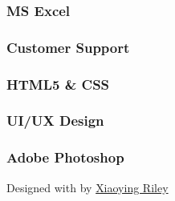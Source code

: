 \documentclass[english,]{article}
\begin{document}
\hypertarget{ms-excel}{%
\subsubsection{MS Excel}\label{ms-excel}}

\hypertarget{customer-support}{%
\subsubsection{Customer Support}\label{customer-support}}

\hypertarget{html5-css}{%
\subsubsection{HTML5 \& CSS}\label{html5-css}}

\hypertarget{uiux-design}{%
\subsubsection{UI/UX Design}\label{uiux-design}}

\hypertarget{adobe-photoshop}{%
\subsubsection{Adobe Photoshop}\label{adobe-photoshop}}

{Designed with \emph{} by \href{http://themes.3rdwavemedia.com}{Xiaoying
Riley}}
\end{document}
